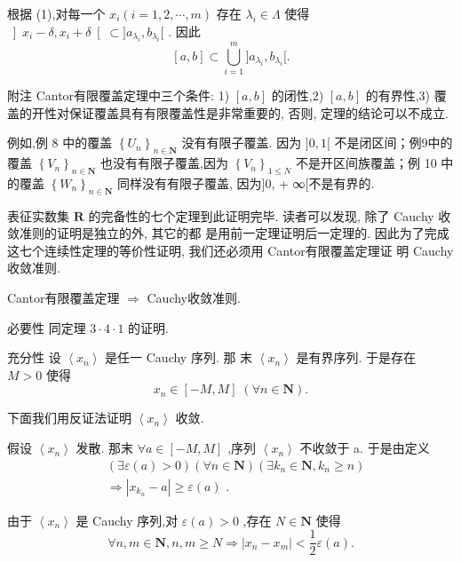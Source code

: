 根据 (1),对每一个 ${x}_{i}\left( {i = 1,2,\cdots ,m}\right)$ 存在 ${\lambda }_{i} \in  \Lambda$ 使得 $\left\rbrack  {{x}_{i} - \delta ,{x}_{i} + \delta }\right\lbrack   \subset  \rbrack {a}_{{\lambda }_{i}},{b}_{{\lambda }_{i}}\lbrack$ . 因此
$$\left\lbrack  {a,b}\right\rbrack   \subset  \mathop{\bigcup }\limits_{{i = 1}}^{m}\rbrack {a}_{{\lambda }_{i}},{b}_{{\lambda }_{i}}\lbrack .$$

附注 Cantor有限覆盖定理中三个条件: 1) $\left\lbrack  {a,b}\right\rbrack$ 的闭性,2) $\left\lbrack  {a,b}\right\rbrack$ 的有界性,3) 覆盖的开性对保证覆盖具有有限覆盖性是非常重要的, 否则, 定理的结论可以不成立.

例如,例 8 中的覆盖 ${\left\{  {U}_{n}\right\}  }_{n \in  \mathbf{N}}$ 没有有限子覆盖. 因为 $\rbrack 0,1\lbrack$ 不是闭区间；例9中的覆盖 ${\left\{  {V}_{n}\right\}  }_{n \in  \mathbf{N}}$ 也没有有限子覆盖,因为 ${\left\{  {V}_{n}\right\}  }_{1 \leq  N}$ 不是开区间族覆盖；例 10 中的覆盖 ${\left\{  {W}_{n}\right\}  }_{n \in  \mathbf{N}}$ 同样没有有限子覆盖, 因为]0, + ∞[不是有界的.

表征实数集 $\mathbf{R}$ 的完备性的七个定理到此证明完毕. 读者可以发现, 除了 Cauchy 收敛准则的证明是独立的外, 其它的都 是用前一定理证明后一定理的. 因此为了完成这七个连续性定理的等价性证明, 我们还必须用 Cantor有限覆盖定理证 明 Cauchy 收敛准则.

Cantor有限覆盖定理 $\Rightarrow$ Cauchy收敛准则.

必要性 同定理 $3 \cdot  4 \cdot  1$ 的证明.

充分性 设 $\left\langle  {x}_{n}\right\rangle$ 是任一 Cauchy 序列. 那 末 $\left\langle  {x}_{n}\right\rangle$ 是有界序列. 于是存在 $M > 0$ 使得
$${x}_{n} \in  \left\lbrack  {-M,M}\right\rbrack  \;\left( {\forall n \in  \mathbf{N}}\right) .$$

下面我们用反证法证明 $\left\langle  {x}_{n}\right\rangle$ 收敛.

假设 $\left\langle  {x}_{n}\right\rangle$ 发散. 那末 $\forall a \in  \left\lbrack  {-M,M}\right\rbrack$ ,序列 $\left\langle  {x}_{n}\right\rangle$ 不收敛于 a. 于是由定义
\begin{align*}
	&\left( {\exists \varepsilon \left( a\right)  > 0}\right) \left( {\forall n \in  \mathbf{N}}\right) \left( {\exists {k}_{n} \in  \mathbf{N},{k}_{n} \geq  n}\right)\\
	&\Rightarrow  \left| {{x}_{{k}_{n}} - a}\right|  \geq  \varepsilon \left( a\right) \text{ . }
\end{align*}

由于 $\left\langle  {x}_{n}\right\rangle$ 是 Cauchy 序列,对 $\varepsilon \left( a\right)  > 0$ ,存在 $N \in  \mathbf{N}$ 使得
$$\forall n,m \in  \mathbf{N},n,m \geq  N \Rightarrow  \left| {{x}_{n} - {x}_{m}}\right|  < \frac{1}{2}\varepsilon \left( a\right) .$$

